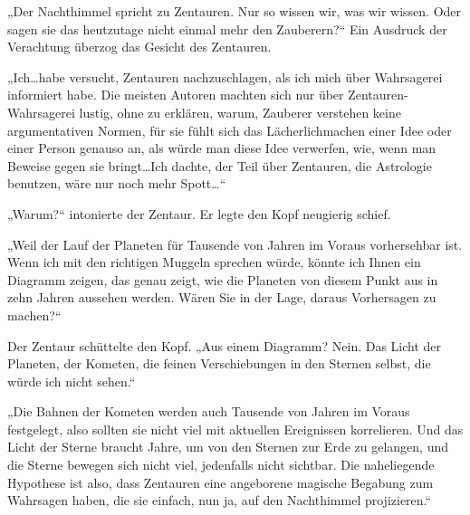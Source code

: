 „Der Nachthimmel spricht zu Zentauren. Nur so wissen wir, was wir wissen. Oder sagen sie das heutzutage nicht einmal mehr den Zauberern?“
Ein Ausdruck der Verachtung überzog das Gesicht des Zentauren.

„Ich…habe versucht, Zentauren nachzuschlagen, als ich mich über Wahrsagerei informiert habe. Die meisten Autoren machten sich nur über Zentauren-Wahrsagerei lustig, ohne zu erklären, warum, Zauberer verstehen keine argumentativen Normen, für sie fühlt sich das Lächerlichmachen einer Idee oder einer Person genauso an, als würde man diese Idee verwerfen, wie, wenn man Beweise gegen sie bringt…Ich dachte, der Teil über Zentauren, die Astrologie benutzen, wäre nur noch mehr Spott…“

„Warum?“ intonierte der Zentaur. Er legte den Kopf neugierig schief.

„Weil der Lauf der Planeten für Tausende von Jahren im Voraus vorhersehbar ist. Wenn ich mit den richtigen Muggeln sprechen würde, könnte ich Ihnen ein Diagramm zeigen, das genau zeigt, wie die Planeten von diesem Punkt aus in zehn Jahren aussehen werden. Wären Sie in der Lage, daraus Vorhersagen zu machen?“

Der Zentaur schüttelte den Kopf. „Aus einem Diagramm? Nein. Das Licht der Planeten, der Kometen, die feinen Verschiebungen in den Sternen selbst, die würde ich nicht sehen.“

„Die Bahnen der Kometen werden auch Tausende von Jahren im Voraus festgelegt, also sollten sie nicht viel mit aktuellen Ereignissen korrelieren. Und das Licht der Sterne braucht Jahre, um von den Sternen zur Erde zu gelangen, und die Sterne bewegen sich nicht viel, jedenfalls nicht sichtbar. Die naheliegende Hypothese ist also, dass Zentauren eine angeborene magische Begabung zum Wahrsagen haben, die sie einfach, nun ja, auf den Nachthimmel projizieren.“


